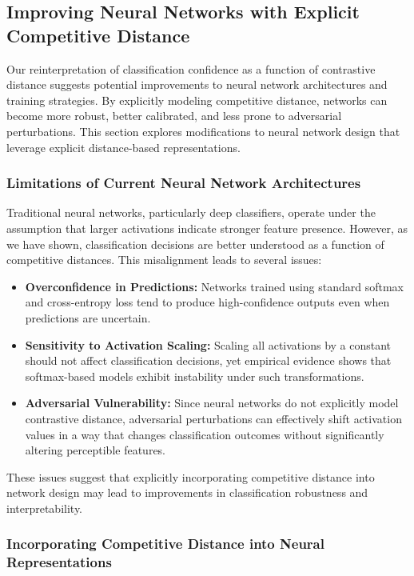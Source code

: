 \subsection{Improving Neural Networks with Explicit Competitive Distance}

Our reinterpretation of classification confidence as a function of contrastive distance suggests potential improvements to neural network architectures and training strategies. By explicitly modeling competitive distance, networks can become more robust, better calibrated, and less prone to adversarial perturbations. This section explores modifications to neural network design that leverage explicit distance-based representations.

\subsubsection{Limitations of Current Neural Network Architectures}

Traditional neural networks, particularly deep classifiers, operate under the assumption that larger activations indicate stronger feature presence. However, as we have shown, classification decisions are better understood as a function of competitive distances. This misalignment leads to several issues:

\begin{itemize}
    \item \textbf{Overconfidence in Predictions:} Networks trained using standard softmax and cross-entropy loss tend to produce high-confidence outputs even when predictions are uncertain.
    \item \textbf{Sensitivity to Activation Scaling:} Scaling all activations by a constant should not affect classification decisions, yet empirical evidence shows that softmax-based models exhibit instability under such transformations.
    \item \textbf{Adversarial Vulnerability:} Since neural networks do not explicitly model contrastive distance, adversarial perturbations can effectively shift activation values in a way that changes classification outcomes without significantly altering perceptible features.
\end{itemize}

These issues suggest that explicitly incorporating competitive distance into network design may lead to improvements in classification robustness and interpretability.

\subsubsection{Incorporating Competitive Distance into Neural Representations}

